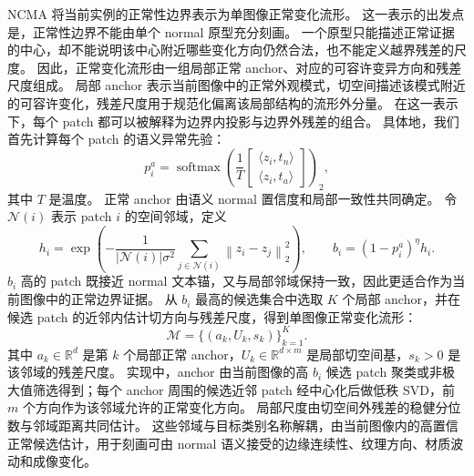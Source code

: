 \documentclass[UTF8,11pt,a4paper,fontset=none]{ctexart}
\newcommand{\method}{NCMA}
\newcommand{\R}{\mathbb{R}}
\newcommand{\M}{\mathcal{M}}
\newcommand{\norm}[1]{\left\lVert #1 \right\rVert}
\newcommand{\softmax}{\operatorname{softmax}}
\begin{document}
\method{} 将当前实例的正常性边界表示为单图像正常变化流形。
这一表示的出发点是，正常性边界不能由单个 normal 原型充分刻画。
一个原型只能描述正常证据的中心，却不能说明该中心附近哪些变化方向仍然合法，也不能定义越界残差的尺度。
因此，正常变化流形由一组局部正常 anchor、对应的可容许变异方向和残差尺度组成。
局部 anchor 表示当前图像中的正常外观模式，切空间描述该模式附近的可容许变化，残差尺度用于规范化偏离该局部结构的流形外分量。
在这一表示下，每个 patch 都可以被解释为边界内投影与边界外残差的组合。
具体地，我们首先计算每个 patch 的语义异常先验：
\begin{equation}
  p_i^a=
  \softmax
  \left(
  \frac{1}{T}
  \begin{bmatrix}
  \langle z_i,t_n\rangle\\
  \langle z_i,t_a\rangle
  \end{bmatrix}
  \right)_2 ,
  \label{eq:semantic_prior}
\end{equation}
其中 \(T\) 是温度。
正常 anchor 由语义 normal 置信度和局部一致性共同确定。
令 \(\mathcal{N}(i)\) 表示 patch \(i\) 的空间邻域，定义
\begin{equation}
  h_i=
  \exp
  \left(
  -\frac{1}{|\mathcal{N}(i)|\sigma^2}
  \sum_{j\in\mathcal{N}(i)}
  \norm{z_i-z_j}_2^2
  \right),
  \qquad
  b_i=(1-p_i^a)^\eta h_i .
  \label{eq:normal_candidate}
\end{equation}
\(b_i\) 高的 patch 既接近 normal 文本锚，又与局部邻域保持一致，因此更适合作为当前图像中的正常边界证据。
从 \(b_i\) 最高的候选集合中选取 \(K\) 个局部 anchor，并在候选 patch 的近邻内估计切方向与残差尺度，得到单图像正常变化流形：
\begin{equation}
  \M=\{(a_k,U_k,s_k)\}_{k=1}^{K}.
  \label{eq:atlas}
\end{equation}
其中 \(a_k\in\R^d\) 是第 \(k\) 个局部正常 anchor，\(U_k\in\R^{d\times m}\) 是局部切空间基，\(s_k>0\) 是该邻域的残差尺度。
实现中，anchor 由当前图像的高 \(b_i\) 候选 patch 聚类或非极大值筛选得到；每个 anchor 周围的候选近邻 patch 经中心化后做低秩 SVD，前 \(m\) 个方向作为该邻域允许的正常变化方向。
局部尺度由切空间外残差的稳健分位数与邻域距离共同估计。
这些邻域与目标类别名称解耦，由当前图像内的高置信正常候选估计，用于刻画可由 normal 语义接受的边缘连续性、纹理方向、材质波动和成像变化。
\end{document}
